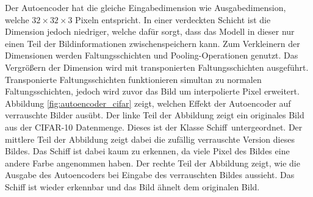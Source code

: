 Der Autoencoder hat die gleiche Eingabedimension wie Ausgabedimension, welche $32\times32\times3$ Pixeln entspricht.
In einer verdeckten Schicht ist die Dimension jedoch niedriger, welche dafür sorgt, dass das Modell in dieser nur einen Teil der Bildinformationen zwischenspeichern kann.
Zum Verkleinern der Dimensionen werden Faltungsschichten und Pooling-Operationen genutzt.
Das Vergrößern der Dimension wird mit transponierten Faltungsschichten ausgeführt.
Transponierte Faltungsschichten funktionieren simultan zu normalen Faltungsschichten, jedoch wird zuvor das Bild um interpolierte Pixel erweitert. 
Abbildung \ref{fig:autoencoder_cifar} zeigt, welchen Effekt der Autoencoder auf verrauschte Bilder ausübt.
Der linke Teil der Abbildung zeigt ein originales Bild aus der CIFAR-10 Datenmenge. 
Dieses ist der Klasse \dq Schiff\dq\ untergeordnet.
Der mittlere Teil der Abbildung zeigt dabei die zufällig verrauschte Version dieses Bildes.
Das Schiff ist dabei kaum zu erkennen, da viele Pixel des Bildes eine andere Farbe angenommen haben.
Der rechte Teil der Abbildung zeigt, wie die Ausgabe des Autoencoders bei Eingabe des verrauschten Bildes aussieht.
Das Schiff ist wieder erkennbar und das Bild ähnelt dem originalen Bild.

